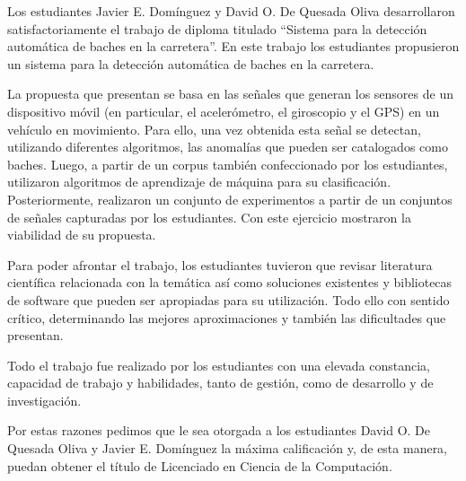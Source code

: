 \begin{opinion}
    Los estudiantes Javier E. Domínguez y David O. De Quesada Oliva desarrollaron satisfactoriamente el trabajo de diploma titulado 
    “Sistema para la detección automática de baches en la carretera”. En este trabajo los estudiantes propusieron un sistema para 
    la detección automática de baches en la carretera.

    La propuesta que presentan se basa en las señales que generan los sensores de un dispositivo móvil (en particular, el acelerómetro, 
    el giroscopio y el GPS) en un vehículo en movimiento. Para ello, una vez obtenida esta señal se detectan, utilizando diferentes algoritmos, 
    las anomalías que pueden ser catalogados como baches. Luego, a partir de un corpus también confeccionado por los estudiantes, 
    utilizaron algoritmos de aprendizaje de máquina para su clasificación. Posteriormente, realizaron un conjunto de experimentos a 
    partir de un conjuntos de señales capturadas por los estudiantes. Con este ejercicio mostraron la viabilidad de su propuesta.


    Para poder afrontar el trabajo, los estudiantes tuvieron que revisar literatura científica relacionada con la temática así como soluciones 
    existentes y bibliotecas de software que pueden ser apropiadas para su utilización. Todo ello con sentido crítico, determinando 
    las mejores aproximaciones y también las dificultades que presentan.

    Todo el trabajo fue realizado por los estudiantes con una elevada constancia, capacidad de trabajo y habilidades, tanto de gestión, como 
    de desarrollo y de investigación. 

    Por estas razones pedimos que le sea otorgada a los estudiantes David O. De Quesada Oliva y Javier E. Domínguez la máxima calificación y, 
    de esta manera,  puedan obtener el título de Licenciado en Ciencia de la Computación.


\end{opinion}
